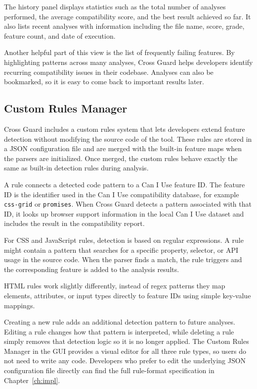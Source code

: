 The history panel displays statistics such as the total number of analyses performed, the average compatibility score, and the best result achieved so far. It also lists recent analyses with information including the file name, score, grade, feature count, and date of execution.

Another helpful part of this view is the list of frequently failing features. By highlighting patterns across many analyses, Cross Guard helps developers identify recurring compatibility issues in their codebase. Analyses can also be bookmarked, so it is easy to come back to important results later.


\subsection{Custom Rules Manager}

Cross Guard includes a custom rules system that lets developers extend feature detection without modifying the source code of the tool. These rules are stored in a JSON configuration file and are merged with the built-in feature maps when the parsers are initialized. Once merged, the custom rules behave exactly the same as built-in detection rules during analysis.

A rule connects a detected code pattern to a Can I Use feature ID. The feature ID is the identifier used in the Can I Use compatibility database, for example \texttt{css-grid} or \texttt{promises}. When Cross Guard detects a pattern associated with that ID, it looks up browser support information in the local Can I Use dataset and includes the result in the compatibility report.

For CSS and JavaScript rules, detection is based on regular expressions. A rule might contain a pattern that searches for a specific property, selector, or API usage in the source code. When the parser finds a match, the rule triggers and the corresponding feature is added to the analysis results.

HTML rules work slightly differently, instead of regex patterns they map elements, attributes, or input types directly to feature IDs using simple key-value mappings.

Creating a new rule adds an additional detection pattern to future analyses. Editing a rule changes how that pattern is interpreted, while deleting a rule simply removes that detection logic so it is no longer applied. The Custom Rules Manager in the GUI provides a visual editor for all three rule types, so users do not need to write any code. Developers who prefer to edit the underlying JSON configuration file directly can find the full rule-format specification in Chapter~\ref{ch:impl}.

